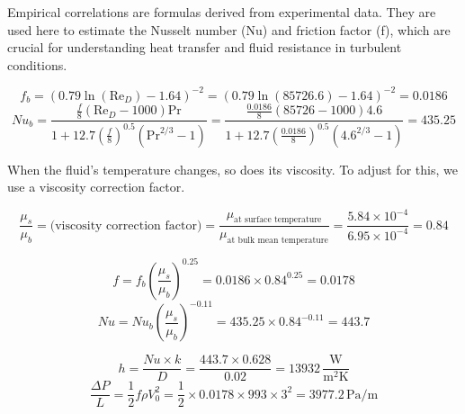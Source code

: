 \documentclass{article}
\numberwithin{equation}{section}
\begin{document}
Empirical correlations are formulas derived from experimental data. They are used here to estimate the Nusselt number (Nu) and friction factor (f), which are crucial for understanding heat transfer and fluid resistance in turbulent conditions.

\begin{equation}
    f_b = \left(0.79 \ln(\text{Re}_D) - 1.64\right)^{-2} = \left(0.79 \ln(85726.6) - 1.64\right)^{-2} = 0.0186
\end{equation}
\begin{equation}
    Nu_b = \frac{\frac{f}{8}(\text{Re}_D - 1000)\text{Pr}}{1 + 12.7 \left(\frac{f}{8}\right)^{0.5}(\text{Pr}^{2/3} - 1)} = \frac{\frac{0.0186}{8}(85726 - 1000)4.6}{1 + 12.7 \left(\frac{0.0186}{8}\right)^{0.5}(4.6^{2/3} - 1)} = 435.25
\end{equation}

When the fluid's temperature changes, so does its viscosity. To adjust for this, we use a viscosity correction factor.

\begin{equation}
    \frac{\mu_s}{\mu_b} = \text{(viscosity correction factor)} = \frac{\mu_{\text{at surface temperature}}}{\mu_{\text{at bulk mean temperature}}} = \frac{5.84 \times 10^{-4}}{6.95 \times 10^{-4}} = 0.84
\end{equation}

\begin{equation}
    f = f_b \left(\frac{\mu_s}{\mu_b}\right)^{0.25} = 0.0186 \times 0.84^{0.25} = 0.0178
\end{equation}
\begin{equation}
    Nu = Nu_b \left(\frac{\mu_s}{\mu_b}\right)^{-0.11} = 435.25 \times 0.84^{-0.11} = 443.7
\end{equation}

\begin{equation}
    h = \frac{Nu \times k}{D} = \frac{443.7 \times 0.628}{0.02} = 13932\, \frac{\text{W}}{\text{m}^2 \text{K}}
\end{equation}
\begin{equation}
    \frac{\Delta P}{L} = \frac{1}{2} f \rho V_0^2 = \frac{1}{2} \times 0.0178 \times 993 \times 3^2 = 3977.2\, \text{Pa/m}
\end{equation}
\end{document}
